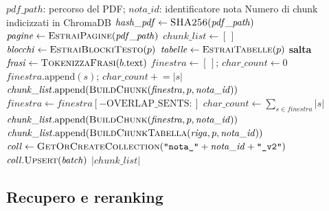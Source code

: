 \begin{algorithm}[htbp]
\caption{Indicizzazione di una nota AIFA (\texttt{indicizza\_nota})}
\label{alg:ingest}
\begin{algorithmic}[1]
\Require $\mathit{pdf\_path}$: percorso del PDF; $\mathit{nota\_id}$: identificatore nota
\Ensure Numero di chunk indicizzati in ChromaDB
\State $\mathit{hash\_pdf} \gets \textsc{SHA256}(\mathit{pdf\_path})$
\State $\mathit{pagine} \gets \textsc{EstraiPagine}(\mathit{pdf\_path})$
\State $\mathit{chunk\_list} \gets [\,]$
  \State $\mathit{blocchi} \gets \textsc{EstraiBlockiTesto}(p)$
  \State $\mathit{tabelle} \gets \textsc{EstraiTabelle}(p)$ 
     \State \textbf{salta}
    \EndIf
    \State $\mathit{frasi} \gets \textsc{TokenizzaFrasi}(b.\text{text})$ 
    \State $\mathit{finestra} \gets [\,]$; $\mathit{char\_count} \gets 0$
      \State $\mathit{finestra}.\text{append}(s)$; $\mathit{char\_count} \mathrel{+}= |s|$
        \State $\mathit{chunk\_list}.\text{append}(\textsc{BuildChunk}(\mathit{finestra}, p, \mathit{nota\_id}))$
        \State $\mathit{finestra} \gets \mathit{finestra}[-\mathrm{OVERLAP\_SENTS}:]$
        \State $\mathit{char\_count} \gets \sum_{s \in \mathit{finestra}} |s|$
      \EndIf
    \EndFor
      \State $\mathit{chunk\_list}.\text{append}(\textsc{BuildChunk}(\mathit{finestra}, p, \mathit{nota\_id}))$
    \EndIf
  \EndFor
  \State {}
    \State $\mathit{chunk\_list}.\text{append}(\textsc{BuildChunkTabella}(\mathit{riga}, p, \mathit{nota\_id}))$
  \EndFor
\EndFor
\State {}
\State $\mathit{coll} \gets \textsc{GetOrCreateCollection}(\texttt{"nota\_"} + \mathit{nota\_id} + \texttt{"\_v2"})$
  \State $\mathit{coll}.\textsc{Upsert}(\mathit{batch})$
\EndFor
\State \Return $|\mathit{chunk\_list}|$
\end{algorithmic}
\end{algorithm}

\subsection{Recupero e reranking}

